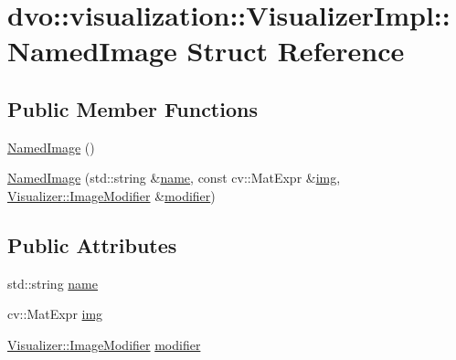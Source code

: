 \hypertarget{structdvo_1_1visualization_1_1_visualizer_impl_1_1_named_image}{}\section{dvo\+:\+:visualization\+:\+:Visualizer\+Impl\+:\+:Named\+Image Struct Reference}
\label{structdvo_1_1visualization_1_1_visualizer_impl_1_1_named_image}
\subsection*{Public Member Functions}
\begin{DoxyCompactItemize}
\item 
\mbox{\hyperlink{structdvo_1_1visualization_1_1_visualizer_impl_1_1_named_image_ad8d49d26aa2b0fd5166857b2ee913489}{Named\+Image}} ()
\item 
\mbox{\hyperlink{structdvo_1_1visualization_1_1_visualizer_impl_1_1_named_image_a85ef82568b83987428230f90bc4c00a2}{Named\+Image}} (std\+::string \&\mbox{\hyperlink{structdvo_1_1visualization_1_1_visualizer_impl_1_1_named_image_aa46e7e1b17cd744452ba8ef3dffddfe7}{name}}, const cv\+::\+Mat\+Expr \&\mbox{\hyperlink{structdvo_1_1visualization_1_1_visualizer_impl_1_1_named_image_a7ff904dac2fc68f459ee05a32abf3cea}{img}}, \mbox{\hyperlink{classdvo_1_1visualization_1_1_visualizer_ac33e0b53e7ef7be64e3230f6c91084a0}{Visualizer\+::\+Image\+Modifier}} \&\mbox{\hyperlink{structdvo_1_1visualization_1_1_visualizer_impl_1_1_named_image_a831a0937bdfc9427f20669770f37f1d0}{modifier}})
\end{DoxyCompactItemize}
\subsection*{Public Attributes}
\begin{DoxyCompactItemize}
\item 
std\+::string \mbox{\hyperlink{structdvo_1_1visualization_1_1_visualizer_impl_1_1_named_image_aa46e7e1b17cd744452ba8ef3dffddfe7}{name}}
\item 
cv\+::\+Mat\+Expr \mbox{\hyperlink{structdvo_1_1visualization_1_1_visualizer_impl_1_1_named_image_a7ff904dac2fc68f459ee05a32abf3cea}{img}}
\item 
\mbox{\hyperlink{classdvo_1_1visualization_1_1_visualizer_ac33e0b53e7ef7be64e3230f6c91084a0}{Visualizer\+::\+Image\+Modifier}} \mbox{\hyperlink{structdvo_1_1visualization_1_1_visualizer_impl_1_1_named_image_a831a0937bdfc9427f20669770f37f1d0}{modifier}}
\end{DoxyCompactItemize}


